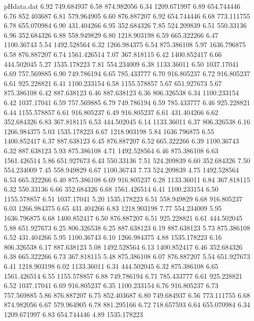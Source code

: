 \begin{filecontents}{pHdata.dat}
6.92 	749.684937
6.58 	874.982056
6.34 	1209.671997
6.89 	654.744446
6.76 	852.403687
6.81 	579.964905
6.60 	876.887207
6.92 	654.744446
6.68 	773.111755
6.78 	655.070984
6.90 	431.404266
6.95 	352.684326
7.85 	524.209839
6.51 	550.33136
6.96 	352.684326
6.88 	558.949829
6.80 	1218.903198
6.59 	665.322266
6.47 	1100.36743
5.54 	1492.528564
6.32 	1266.984375
6.54 	875.386108
5.97 	1636.796875
6.58 	876.887207
6.74 	1561.426514
7.07 	367.818115
6.42 	1400.852417
6.66 	444.502045
5.27 	1535.178223
7.81 	554.234009
6.38 	1133.36011
6.50 	1037.17041
6.69 	757.569885
6.90 	749.786194
6.65 	785.433777
6.70 	916.805237
6.72 	916.805237
6.61 	925.228821
6.41 	1100.233154
6.58 	1155.578857
5.67 	651.927673
5.67 	875.386108
6.42 	887.638123
6.46 	887.638123
6.36 	806.326538
6.34 	1100.233154
6.42 	1037.17041
6.59 	757.569885
6.79 	749.786194
6.59 	785.433777
6.46 	925.228821
6.44 	1155.578857
6.61 	916.805237
6.49 	916.805237
6.61 	431.404266
6.62 	352.684326
6.83 	367.818115
6.53 	444.502045
6.14 	1133.36011
6.37 	806.326538
6.16 	1266.984375
5.03 	1535.178223
6.67 	1218.903198
5.84 	1636.796875
6.55 	1400.852417
6.37 	887.638123
6.45 	876.887207
6.52 	665.322266
6.39 	1100.36743
6.32 	887.638123
5.93 	875.386108
4.71 	1492.528564
6.46 	875.386108
6.63 	1561.426514
5.86 	651.927673
6.43 	550.33136
7.51 	524.209839
6.60 	352.684326
7.50 	554.234009
7.45 	558.949829
6.67 	1100.36743
7.73 	524.209839
4.75 	1492.528564
6.53 	665.322266
6.40 	875.386108
6.69 	916.805237
6.28 	1133.36011
6.84 	367.818115
6.32 	550.33136
6.66 	352.684326
6.68 	1561.426514
6.41 	1100.233154
6.50 	1155.578857
6.51 	1037.17041
5.20 	1535.178223
6.51 	558.949829
6.68 	916.805237
6.03 	1266.984375
6.65 	431.404266
6.83 	1218.903198
7.77 	554.234009
5.95 	1636.796875
6.68 	1400.852417
6.50 	876.887207
6.51 	925.228821
6.61 	444.502045
5.88 	651.927673
6.25 	806.326538
6.25 	887.638123
6.19 	887.638123
5.73 	875.386108
6.52 	431.404266
5.95 	1100.36743
6.10 	1266.984375
4.88 	1535.178223
6.16 	806.326538
6.17 	887.638123
5.08 	1492.528564
6.13 	1400.852417
6.46 	352.684326
6.38 	665.322266
6.73 	367.818115
5.48 	875.386108
6.07 	876.887207
5.54 	651.927673
6.41 	1218.903198
6.02 	1133.36011
6.31 	444.502045
6.32 	875.386108
6.65 	1561.426514
6.55 	1155.578857
6.88 	749.786194
6.71 	785.433777
6.61 	925.228821
6.52 	1037.17041
6.69 	916.805237
6.35 	1100.233154
6.76 	916.805237
6.73 	757.569885
5.86 	876.887207
6.75 	852.403687
6.80 	749.684937
6.56 	773.111755
6.68 	874.982056
6.67 	579.964905
6.78 	881.295166
6.72 	718.657593
6.64 	655.070984
6.34 	1209.671997
6.83 	654.744446
4.89 	1535.178223

\end{filecontents}
